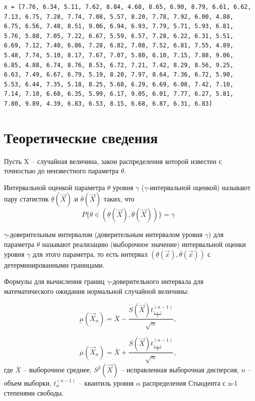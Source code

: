 \begin{lstlisting}[caption={Выборка для варианта №8}]
x = [7.76, 6.34, 5.11, 7.62, 8.84, 4.68, 8.65, 6.90, 8.79, 6.61, 6.62, 7.13, 6.75, 7.28, 7.74, 7.08, 5.57, 8.20, 7.78, 7.92, 6.00, 4.88, 6.75, 6.56, 7.48, 8.51, 9.06, 6.94, 6.93, 7.79, 5.71, 5.93, 6.81, 5.76, 5.88, 7.05, 7.22, 6.67, 5.59, 6.57, 7.28, 6.22, 6.31, 5.51, 6.69, 7.12, 7.40, 6.86, 7.28, 6.82, 7.08, 7.52, 6.81, 7.55, 4.89, 5.48, 7.74, 5.10, 8.17, 7.67, 7.07, 5.80, 6.10, 7.15, 7.88, 9.06, 6.85, 4.88, 6.74, 8.76, 8.53, 6.72, 7.21, 7.42, 8.29, 8.56, 9.25, 6.63, 7.49, 6.67, 6.79, 5.19, 8.20, 7.97, 8.64, 7.36, 6.72, 5.90, 5.53, 6.44, 7.35, 5.18, 8.25, 5.68, 6.29, 6.69, 6.08, 7.42, 7.10, 7.14, 7.10, 6.60, 6.35, 5.99, 6.17, 9.05, 6.01, 7.77, 6.27, 5.81, 7.80, 9.89, 4.39, 6.83, 6.53, 8.15, 6.68, 6.87, 6.31, 6.83]
\end{lstlisting}


\section{Теоретические сведения}

Пусть X -- случайная величина, закон распределения которой известен с точностью до неизвестного параметра $\theta$. 

Интервальной оценкой параметра $\theta$ уровня $\gamma$ ($\gamma$-интервальной оценкой) называют пару статистик $\underline{\theta}(\vec X) \text{ и } \overline{\theta}(\vec X)$ таких, что $$P\{\theta \in (\underline{\theta}(\vec X), \overline{\theta}(\vec X))\}=\gamma$$ 

$\gamma$-доверительным интервалом (доверительным интервалом уровня $\gamma$) для параметра $\theta$ называют реализацию (выборочное значение) интервальной оценки уровня $\gamma$ для этого параметра, то есть интервал $(\underline{\theta}(\vec x), \overline{\theta}(\vec x))$ с детерминированными границами.

Формулы для вычисления границ $\gamma$-доверительного интервала для математического ожидания нормальной случайной величины:

$$
\underline\mu(\vec X_n)=\overline X - \frac{S(\vec X)t^{(n-1)}_{\frac{1+\gamma}{2}}}{\sqrt{n}},
$$

$$
\overline\mu(\vec X_n)=\overline X + \frac{S(\vec X)t^{(n-1)}_{\frac{1+\gamma}{2}}}{\sqrt{n}},
$$
где $\overline X$ -- выборочное среднее, $S^2(\vec X)$ -- исправленная выборочная дисперсия, $n$ -- объем выборки, $t^{(n-1)}_{\alpha}$ -- квантиль уровня $\alpha$ распределения Стьюдента с n-1 степенями свободы.

